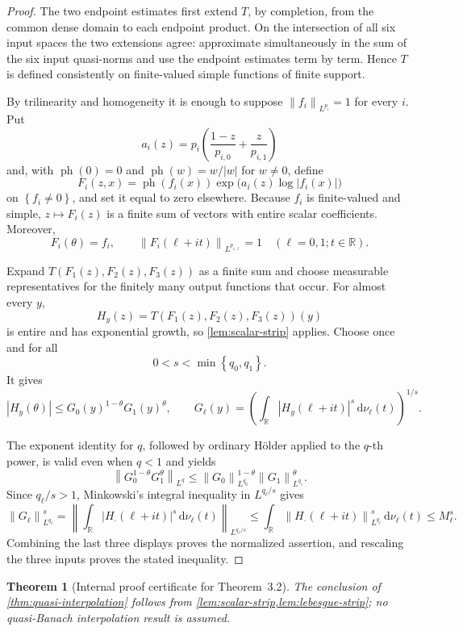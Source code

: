 \documentclass[11pt]{article}
\newtheorem{theorem}{Theorem}[section]
\newcommand{\R}{\mathbb{R}}
\newcommand{\dd}{\,\mathrm{d}}
\newcommand{\norm}[2]{\left\lVert #1\right\rVert_{#2}}
\newcommand{\abs}[1]{\left|#1\right|}
\newcommand{\set}[1]{\left\{#1\right\}}
\begin{document}
	\begin{proof}
		The two endpoint estimates first extend \(T\), by completion, from the common dense domain to each endpoint product.  On the intersection of all six input spaces the two extensions agree: approximate simultaneously in the sum of the six input quasi-norms and use the endpoint estimates term by term.  Hence \(T\) is defined consistently on finite-valued simple functions of finite support.
		
		By trilinearity and homogeneity it is enough to suppose
		\(\norm{f_i}{L^{p_i}}=1\) for every \(i\).  Put
		\[
		a_i(z)=p_i\left(\frac{1-z}{p_{i,0}}+\frac{z}{p_{i,1}}\right)
		\]
		and, with \(\operatorname{ph}(0)=0\) and
		\(\operatorname{ph}(w)=w/\abs w\) for \(w\neq0\), define
		\[
		F_i(z,x)=\operatorname{ph}(f_i(x))
		\exp\bigl(a_i(z)\log\abs{f_i(x)}\bigr)
		\]
		on \(\set{f_i\neq0}\), and set it equal to zero elsewhere.  Because \(f_i\) is finite-valued and simple, \(z\mapsto F_i(z)\) is a finite sum of vectors with entire scalar coefficients.  Moreover,
		\[
		F_i(\theta)=f_i,
		\qquad
		\norm{F_i(\ell+it)}{L^{p_{i,\ell}}}=1
		\quad(\ell=0,1;t\in\R).
		\]
		
		Expand \(T(F_1(z),F_2(z),F_3(z))\) as a finite sum and choose measurable representatives for the finitely many output functions that occur.  For almost every \(y\),
		\[
		H_y(z)=T(F_1(z),F_2(z),F_3(z))(y)
		\]
		is entire and has exponential growth, so \cref{lem:scalar-strip} applies.  Choose once and for all
		\[
		0<s<\min\set{q_0,q_1}.
		\]
		It gives
		\[
		\abs{H_y(\theta)}\leq G_0(y)^{1-\theta}G_1(y)^\theta,
		\qquad
		G_\ell(y)=
		\left(\int_\R\abs{H_y(\ell+it)}^s\dd\nu_\ell(t)\right)^{1/s}.
		\]
		
		The exponent identity for \(q\), followed by ordinary H\"older applied to the \(q\)-th power, is valid even when \(q<1\) and yields
		\[
		\norm{G_0^{1-\theta}G_1^\theta}{L^q}
		\leq
		\norm{G_0}{L^{q_0}}^{1-\theta}
		\norm{G_1}{L^{q_1}}^\theta.
		\]
		Since \(q_\ell/s>1\), Minkowski's integral inequality in \(L^{q_\ell/s}\) gives
		\[
		\norm{G_\ell}{L^{q_\ell}}^s
		=
		\left\|
		\int_\R\abs{H_{\cdot}(\ell+it)}^s\dd\nu_\ell(t)
		\right\|_{L^{q_\ell/s}}
		\leq
		\int_\R
		\norm{H_{\cdot}(\ell+it)}{L^{q_\ell}}^s
		\dd\nu_\ell(t)
		\leq M_\ell^s.
		\]
		Combining the last three displays proves the normalized assertion, and rescaling the three inputs proves the stated inequality.
	\end{proof}
	
	\begin{theorem}[Internal proof certificate for Theorem~3.2]\label{thm:gm-internal}
		The conclusion of \cref{thm:quasi-interpolation} follows from \cref{lem:scalar-strip,lem:lebesgue-strip}; no quasi-Banach interpolation result is assumed.
	\end{theorem}
	
\end{document}
